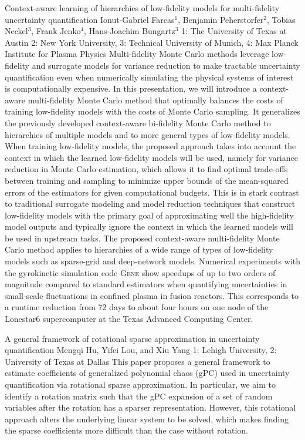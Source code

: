 \begin{addmargin}[2em]{0em}
\vspace{1.5ex}
\abs
{Context-aware learning of hierarchies of low-fidelity models for multi-fidelity uncertainty quantification}
{Ionut-Gabriel Farcas$^{1}$, Benjamin Peherstorfer$^{2}$, Tobias Neckel$^{3}$, Frank Jenko$^{4}$, Hans-Joachim Bungartz$^{3}$}
{1: The University of Texas at Austin 2: New York University, 3: Technical University of Munich, 4: Max Planck Institute for Plasma Physics}
{Multi-fidelity Monte Carlo methods leverage low-fidelity and surrogate models for variance
reduction to make tractable uncertainty quantification even when numerically simulating the
physical systems of interest is computationally expensive.
In this presentation, we will introduce a context-aware multi-fidelity Monte Carlo method that
optimally balances the costs of training low-fidelity models with the costs of Monte Carlo
sampling.
It generalizes the previously developed context-aware bi-fidelity Monte Carlo method
to hierarchies of multiple models and to more general types of low-fidelity models.
When training low-fidelity models, the proposed approach takes into account the context in which
the learned low-fidelity models will be used, namely for variance reduction in Monte Carlo
estimation, which allows it to find optimal trade-offs between training and sampling to minimize
upper bounds of the mean-squared errors of the estimators for given computational budgets.
This is in stark contrast to traditional surrogate modeling and model reduction techniques that
construct low-fidelity models with the primary goal of approximating well the high-fidelity model
outputs and typically ignore the context in which the learned models will be used in upstream
tasks.
The proposed context-aware multi-fidelity Monte Carlo method applies to hierarchies of a
wide range of types of low-fidelity models such as sparse-grid and deep-network models.
Numerical experiments with the gyrokinetic simulation code \textsc{Gene} show speedups of up to
two orders of magnitude compared to standard estimators when quantifying uncertainties in small-scale fluctuations in confined plasma in fusion reactors.
This corresponds to a runtime reduction from 72 days to about four hours on one node of the
Lonestar6 supercomputer at the Texas Advanced Computing Center.}


\vspace{1.5ex}
\abs
{A general framework of rotational sparse approximation in uncertainty quantification}
{Mengqi Hu, Yifei Lou, and Xiu Yang}
{1: Lehigh University, 2: University of Texas at Dallas}
{This paper proposes a general framework to estimate coefficients of generalized  polynomial chaos (gPC) used in uncertainty quantification via rotational sparse approximation. In particular, we aim to identify a rotation matrix such that the gPC expansion of a set of random variables after the rotation has a sparser representation. However, this rotational approach alters the underlying linear system to be solved, which makes finding the sparse coefficients more difficult than the case without rotation.}



\end{addmargin}
